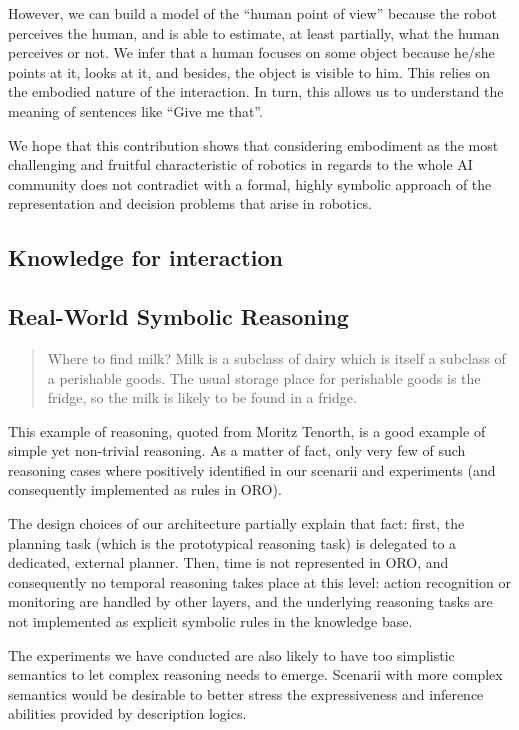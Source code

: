 However, we can build a model of the ``human point of view'' because the robot
perceives the human, and is able to estimate, at least partially, what the
human perceives or not. We infer that a human focuses on some object because
he/she points at it, looks at it, and besides, the object is visible to him.
This relies on the embodied nature of the interaction. In turn, this allows us
to understand the meaning of sentences like ``Give me that''.

We hope that this contribution shows that considering embodiment as the most
challenging and fruitful characteristic of robotics in regards to the whole AI
community does not contradict with a formal, highly symbolic approach of the
representation and decision problems that arise in robotics. 


\subsection{Knowledge for interaction}

\subsection{Real-World Symbolic Reasoning}

\begin{quote}

    Where to find milk? Milk is a subclass of dairy which is itself a subclass
    of a perishable goods. The usual storage place for perishable goods is the
    fridge, so the milk is likely to be found in a fridge.

\end{quote}

This example of reasoning, quoted from Moritz Tenorth, is a good example of
simple yet non-trivial reasoning. As a matter of fact, only very few of such
reasoning cases where positively identified in our scenarii and experiments
(and consequently implemented as rules in ORO).

The design choices of our architecture partially explain that fact: first, the
planning task (which is the prototypical reasoning task) is delegated to a
dedicated, external planner. Then, time is not represented in ORO, and
consequently no temporal reasoning takes place at this level: action
recognition or monitoring are handled by other layers, and the underlying
reasoning tasks are not implemented as explicit symbolic rules in the knowledge
base.

The experiments we have conducted are also likely to have too simplistic
semantics to let complex reasoning needs to emerge. Scenarii with more complex
semantics would be desirable to better stress the expressiveness and inference
abilities provided by description logics.

